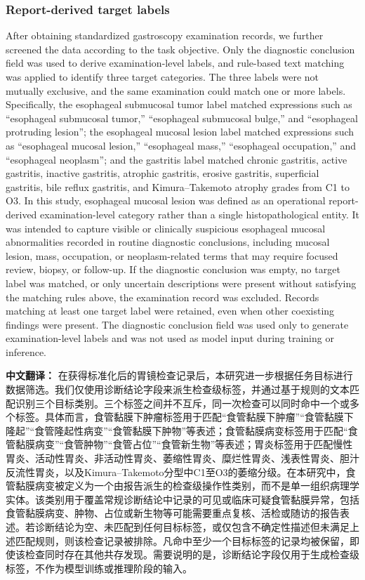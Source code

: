 \documentclass[Afour,sagev,times]{sagej}
\begin{document}
\subsubsection{Report-derived target labels}
After obtaining standardized gastroscopy examination records, we further screened the data according to the task objective. Only the diagnostic conclusion field was used to derive examination-level labels, and rule-based text matching was applied to identify three target categories. The three labels were not mutually exclusive, and the same examination could match one or more labels. Specifically, the esophageal submucosal tumor label matched expressions such as ``esophageal submucosal tumor,'' ``esophageal submucosal bulge,'' and ``esophageal protruding lesion''; the esophageal mucosal lesion label matched expressions such as ``esophageal mucosal lesion,'' ``esophageal mass,'' ``esophageal occupation,'' and ``esophageal neoplasm''; and the gastritis label matched chronic gastritis, active gastritis, inactive gastritis, atrophic gastritis, erosive gastritis, superficial gastritis, bile reflux gastritis, and Kimura--Takemoto atrophy grades from C1 to O3.\cite{R16} In this study, esophageal mucosal lesion was defined as an operational report-derived examination-level category rather than a single histopathological entity. It was intended to capture visible or clinically suspicious esophageal mucosal abnormalities recorded in routine diagnostic conclusions, including mucosal lesion, mass, occupation, or neoplasm-related terms that may require focused review, biopsy, or follow-up. If the diagnostic conclusion was empty, no target label was matched, or only uncertain descriptions were present without satisfying the matching rules above, the examination record was excluded. Records matching at least one target label were retained, even when other coexisting findings were present. The diagnostic conclusion field was used only to generate examination-level labels and was not used as model input during training or inference.

\textbf{中文翻译：} 在获得标准化后的胃镜检查记录后，本研究进一步根据任务目标进行数据筛选。我们仅使用诊断结论字段来派生检查级标签，并通过基于规则的文本匹配识别三个目标类别。三个标签之间并不互斥，同一次检查可以同时命中一个或多个标签。具体而言，食管黏膜下肿瘤标签用于匹配“食管黏膜下肿瘤”“食管黏膜下隆起”“食管隆起性病变”“食管黏膜下肿物”等表述；食管黏膜病变标签用于匹配“食管黏膜病变”“食管肿物”“食管占位”“食管新生物”等表述；胃炎标签用于匹配慢性胃炎、活动性胃炎、非活动性胃炎、萎缩性胃炎、糜烂性胃炎、浅表性胃炎、胆汁反流性胃炎，以及Kimura--Takemoto分型中C1至O3的萎缩分级。在本研究中，食管黏膜病变被定义为一个由报告派生的检查级操作性类别，而不是单一组织病理学实体。该类别用于覆盖常规诊断结论中记录的可见或临床可疑食管黏膜异常，包括食管黏膜病变、肿物、占位或新生物等可能需要重点复核、活检或随访的报告表述。若诊断结论为空、未匹配到任何目标标签，或仅包含不确定性描述但未满足上述匹配规则，则该检查记录被排除。凡命中至少一个目标标签的记录均被保留，即使该检查同时存在其他共存发现。需要说明的是，诊断结论字段仅用于生成检查级标签，不作为模型训练或推理阶段的输入。
\end{document}

